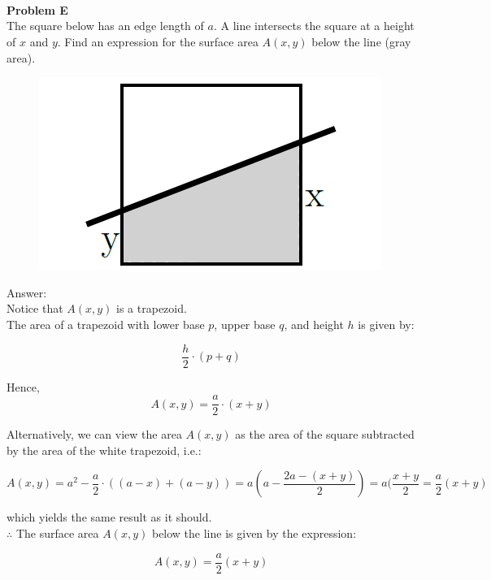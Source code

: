 \documentclass[12pt, letterpaper]{report}
\begin{document}
\makebox[\linewidth]{\rule{\textwidth}{0.4pt}}\\

\newpage

\makebox[\linewidth]{\rule{\textwidth}{0.4pt}}\\
\\\textbf{Problem E}\\
The square below has an edge length of $a$. A line intersects the square at a height of $x$ and $y$. Find an expression for the surface area $A(x,y)$ below the line (gray area).

\begin{figure}[h!]
	{\centering
		\includegraphics[scale = 0.5]{ProblemE.png}
	\par}
\end{figure}

Answer:\\
Notice that $A(x,y)$ is a trapezoid.\\

The area of a trapezoid with lower base $p$, upper base $q$, and height $h$ is given by:

\begin{equation*}
	\frac{h}{2} \cdot (p + q)
\end{equation*}

Hence,
\begin{equation*}
	A(x,y) = \frac{a}{2} \cdot (x + y)
\end{equation*}

Alternatively, we can view the area $A(x,y)$ as the area of the square subtracted by the area of the white trapezoid, i.e.:

\begin{equation*}
	A(x,y) = a^2 - \frac{a}{2} \cdot ((a - x) + (a - y)) = a(a - \frac{2a - (x + y)}{2}) = a(\frac{x + y}{2} = \frac{a}{2}(x + y)
\end{equation*}

which yields the same result as it should.\\

$\therefore$ The surface area $A(x,y)$ below the line is given by the expression:

\begin{equation*}
	A(x,y) = \frac{a}{2}(x + y)
\end{equation*}
\end{document}
